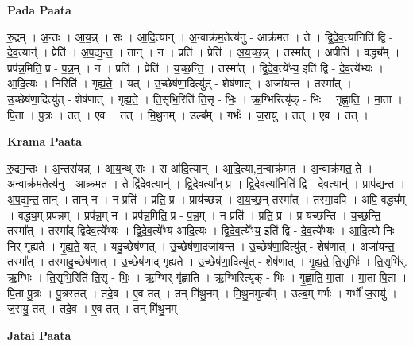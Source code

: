 \documentclass[17pt]{extarticle}
\begin{document}
\textbf{Pada Paata} \newline

रु॒द्रम् । अ॒न्तः । आ॒य॒न्न् । सः । आ॒दि॒त्यान् । अ॒न्वाक्र॑म॒तेत्य॑नु - आक्र॑मत । ते । द्वि॒दे॒व॒त्या॑निति॑ द्वि - दे॒व॒त्यान्॑ । प्रेति॑ । अ॒प॒द्य॒न्त॒ । तान् । न । प्रति॑ । प्रेति॑ । अ॒य॒च्छ॒न्न् । तस्मा᳚त् । अपीति॑ । वद्ध्य᳚म् । प्रप॑न्न॒मिति॒ प्र - प॒न्न॒म् । न । प्रति॑ । प्रेति॑ । य॒च्छ॒न्ति॒ । तस्मा᳚त् । द्वि॒दे॒व॒त्ये᳚भ्य॒ इति॑ द्वि - दे॒व॒त्ये᳚भ्यः । आ॒दि॒त्यः । निरिति॑ । गृ॒ह्य॒ते॒ । यत् । उ॒च्छेष॑णा॒दित्यु॑त् - शेष॑णात् । अजा॑यन्त । तस्मा᳚त् । उ॒च्छेष॑णा॒दित्यु॑त् - शेष॑णात् । गृ॒ह्य॒ते॒ । ति॒सृभि॒रिति॑ ति॒सृ - भिः॒ । ऋ॒ग्भिरित्यृ॑क् - भिः । गृ॒ह्णा॒ति॒ । मा॒ता । पि॒ता । पु॒त्रः । तत् । ए॒व । तत् । मि॒थु॒नम् । उल्ब᳚म् । गर्भः॑ । ज॒रायु॑ । तत् । ए॒व । तत् ।  \newline


\textbf{Krama Paata} \newline

रु॒द्रम॒न्तः । अ॒न्तरा॑यन्न् । आ॒य॒न्थ् सः । स आ॑दि॒त्यान् । आ॒दि॒त्या,न॒न्वाक्र॑मत । अ॒न्वाक्र॑मत॒ ते । अ॒न्वाक्र॑म॒तेत्य॑नु - आक्र॑मत । ते द्वि॑देव॒त्यान्॑ । द्वि॒दे॒व॒त्या᳚न् प्र । द्वि॒दे॒व॒त्या॑निति॑ द्वि - दे॒व॒त्यान्॑ । प्राप॑द्यन्त । अ॒प॒द्य॒न्त॒ तान् । तान् न । न प्रति॑ । प्रति॒ प्र । प्राय॑च्छन्न् । अ॒य॒च्छ॒न् तस्मा᳚त् । तस्मा॒दपि॑ । अपि॒ वद्ध्य᳚म् । वद्ध्य॒म् प्रप॑न्नम् । प्रप॑न्न॒म् न । प्रप॑न्न॒मिति॒ प्र - प॒न्न॒म् । न प्रति॑ । प्रति॒ प्र । प्र य॑च्छन्ति । य॒च्छ॒न्ति॒ तस्मा᳚त् । तस्मा᳚द् द्विदेव॒त्ये᳚भ्यः । द्वि॒दे॒व॒त्ये᳚भ्य आदि॒त्यः । द्वि॒दे॒व॒त्ये᳚भ्य॒ इति॑ द्वि - दे॒व॒त्ये᳚भ्यः । आ॒दि॒त्यो निः । निर् गृ॑ह्यते । गृ॒ह्य॒ते॒ यत् । यदु॒च्छेष॑णात् । उ॒च्छेष॑णा॒दजा॑यन्त । उ॒च्छेष॑णा॒दित्यु॑त् - शेष॑णात् । अजा॑यन्त॒ तस्मा᳚त् । तस्मा॑दु॒च्छेष॑णात् । उ॒च्छेष॑णाद् गृह्यते । उ॒च्छेष॑णा॒दित्यु॑त् - शेष॑णात् । गृ॒ह्य॒ते॒ ति॒सृभिः॑ । ति॒सृभि॑र्. ऋ॒ग्भिः । ति॒सृभि॒रिति॑ ति॒सृ - भिः॒ । ऋ॒ग्भिर् गृ॑ह्णाति । ऋ॒ग्भिरित्यृ॑क् - भिः । गृ॒ह्णा॒ति॒ मा॒ता । मा॒ता पि॒ता । पि॒ता पु॒त्रः । पु॒त्रस्तत् । तदे॒व । ए॒व तत् । तन् मि॑थु॒नम् । मि॒थु॒नमुल्ब᳚म् । उल्ब॒म् गर्भः॑ । गर्भो॑ ज॒रायु॑ । ज॒रायु॒ तत् । तदे॒व । ए॒व तत् । तन् मि॑थु॒नम् \newline

\textbf{Jatai Paata} \newline
\end{document}
